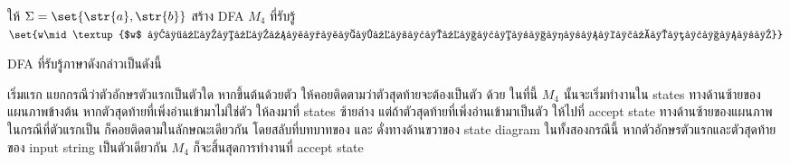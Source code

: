 \begin{example}
ให้ $\Sigma=\set{\str{a},\str{b}}$ \enskip สร้าง DFA $M_4$ ที่รับรู้ $\set{w\mid\textup{$w$ ขึ้นต้นและลงท้ายด้วยตัวอักษรเดียวกัน}}$

DFA ที่รับรู้ภาษาดังกล่าวเป็นดังนี้
\begin{center}
\end{center}
เริ่มแรก แยกกรณีว่าตัวอักษรตัวแรกเป็นตัวใด หากขึ้นต้นด้วยตัว  ให้คอยติดตามว่าตัวสุดท้ายจะต้องเป็นตัว  ด้วย \enskip ในที่นี้ $M_4$ นั้นจะเริ่มทำงานใน states ทางด้านซ้ายของแผนภาพข้างต้น \enskip หากตัวสุดท้ายที่เพิ่งอ่านเข้ามาไม่ใช่ตัว  ให้ลงมาที่ states ซ้ายล่าง แต่ถ้าตัวสุดท้ายที่เพิ่งอ่านเข้ามาเป็นตัว  ให้ไปที่ accept state ทางด้านซ้ายของแผนภาพ \enskip ในกรณีที่ตัวแรกเป็น  ก็คอยติดตามในลักษณะเดียวกัน โดยสลับที่บทบาทของ  และ  ดั่งทางด้านขวาของ state diagram \enskip ในทั้งสองกรณีนี้ หากตัวอักษรตัวแรกและตัวสุดท้ายของ input string เป็นตัวเดียวกัน $M_4$ ก็จะสิ้นสุดการทำงานที่ accept state
\end{example}


